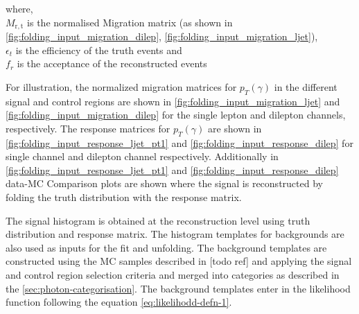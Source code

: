 where, \\
$M_{\mathrm{r,t}}$ is the normalised Migration matrix (as shown in \cref{fig:folding_input_migration_dilep}, \cref{fig:folding_input_migration_ljet}),\\
$\epsilon_{t}$ is the efficiency of the truth events and \\
$f_{r}$ is the acceptance of the reconstructed events

\vspace*{20pt}

For illustration, the normalized migration matrices for $p_T(\gamma)$ in the different signal and control regions are shown in \cref{fig:folding_input_migration_ljet} and \cref{fig:folding_input_migration_dilep} for the single lepton and dilepton channels, respectively. The response matrices for $p_T(\gamma)$  are shown in \cref{fig:folding_input_response_ljet_pt1} and \cref{fig:folding_input_response_dilep} for single channel and dilepton channel respectively. Additionally in \cref{fig:folding_input_response_ljet_pt1} and \cref{fig:folding_input_response_dilep} data-MC Comparison plots are shown where the signal is reconstructed by folding the truth distribution with the response matrix. 

The signal histogram is obtained at the reconstruction level using truth distribution and response matrix. The histogram templates for backgrounds are also used as inputs for the fit and unfolding. The background templates are constructed using the MC samples described in [todo ref] and applying the signal and control region selection criteria and merged into categories as described in the \cref{sec:photon-categorisation}. The background templates enter in the likelihood function following the equation \cref{eq:likelihodd-defn-1}.




